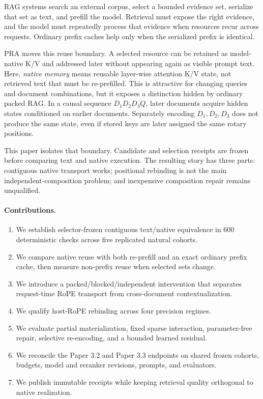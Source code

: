 \documentclass[11pt]{article}
\begin{document}
RAG systems search an external corpus, select a bounded evidence set, serialize
that set as text, and prefill the model. Retrieval must expose the right
evidence, and the model must repeatedly process that evidence when resources
recur across requests. Ordinary prefix caches help only when the serialized
prefix is identical.

PRA moves this reuse boundary. A selected resource can be retained as
model-native K/V and addressed later without appearing again as visible prompt
text. Here, \emph{native memory} means reusable layer-wise attention K/V state,
not retrieved text that must be re-prefilled. This is attractive for changing
queries and document combinations, but it exposes a distinction hidden by
ordinary packed RAG. In a causal sequence $D_1D_2D_3Q$, later documents acquire
hidden states conditioned on earlier documents. Separately encoding
$D_1,D_2,D_3$ does not produce the same state, even if stored keys are later
assigned the same rotary positions.

This paper isolates that boundary. Candidate and selection receipts are frozen
before comparing text and native execution. The resulting story has three
parts: contiguous native transport works; positional rebinding is not the main
independent-composition problem; and inexpensive composition repair remains
unqualified.

\paragraph{Contributions.}
\begin{enumerate}[leftmargin=*]
  \item We establish selector-frozen contiguous text/native equivalence in 600
  deterministic checks across five replicated natural cohorts.
  \item We compare native reuse with both re-prefill and an exact ordinary
  prefix cache, then measure non-prefix reuse when selected sets change.
  \item We introduce a packed/blocked/independent intervention that separates
  request-time RoPE transport from cross-document contextualization.
  \item We qualify host-RoPE rebinding across four precision regimes.
  \item We evaluate partial materialization, fixed sparse interaction,
  parameter-free repair, selective re-encoding, and a bounded learned residual.
  \item We reconcile the Paper 3.2 and Paper 3.3 endpoints on shared frozen
  cohorts, budgets, model and reranker revisions, prompts, and evaluators.
  \item We publish immutable receipts while keeping retrieval quality
  orthogonal to native realization.
\end{enumerate}
\end{document}
